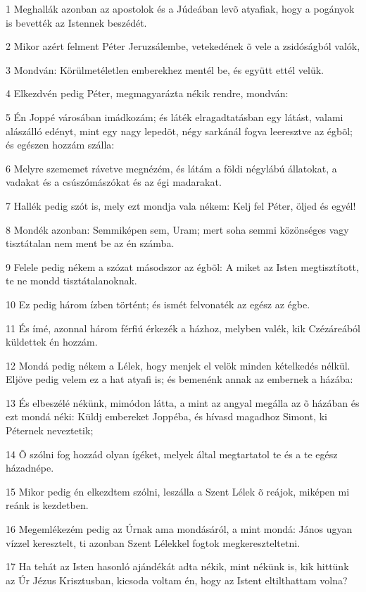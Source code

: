 \par 1 Meghallák azonban az apostolok és a Júdeában levõ atyafiak, hogy a pogányok is bevették az Istennek beszédét.
\par 2 Mikor azért felment Péter Jeruzsálembe, vetekedének õ vele a zsidóságból valók,
\par 3 Mondván: Körülmetéletlen emberekhez mentél be, és együtt ettél velük.
\par 4 Elkezdvén pedig Péter, megmagyarázta nékik rendre, mondván:
\par 5 Én Joppé városában imádkozám; és láték elragadtatásban egy látást, valami alászálló edényt, mint egy nagy lepedõt, négy sarkánál fogva leeresztve az égbõl; és egészen hozzám szálla:
\par 6 Melyre szememet rávetve megnézém, és látám a földi négylábú állatokat, a vadakat és a csúszómászókat és az égi madarakat.
\par 7 Hallék pedig szót is, mely ezt mondja vala nékem: Kelj fel Péter, öljed és egyél!
\par 8 Mondék azonban: Semmiképen sem, Uram; mert soha semmi közönséges vagy tisztátalan nem ment be az én számba.
\par 9 Felele pedig nékem a szózat másodszor az égbõl: A miket az Isten megtisztított, te ne mondd tisztátalanoknak.
\par 10 Ez pedig három ízben történt; és ismét felvonaték az egész az égbe.
\par 11 És ímé, azonnal három férfiú érkezék a házhoz, melyben valék, kik Czézáreából küldettek én hozzám.
\par 12 Mondá pedig nékem a Lélek, hogy menjek el velök minden kételkedés nélkül. Eljöve pedig velem ez a hat atyafi is; és bemenénk annak az embernek a házába:
\par 13 És elbeszélé nékünk, mimódon látta, a mint az angyal megálla az õ házában és ezt mondá néki: Küldj embereket Joppéba, és hívasd magadhoz Simont, ki Péternek neveztetik;
\par 14 Õ szólni fog hozzád olyan ígéket, melyek által megtartatol te és a te egész házadnépe.
\par 15 Mikor pedig én elkezdtem szólni, leszálla a Szent Lélek õ reájok, miképen mi reánk is kezdetben.
\par 16 Megemlékezém pedig az Úrnak ama mondásáról, a mint mondá: János ugyan vízzel keresztelt, ti azonban Szent Lélekkel fogtok megkereszteltetni.
\par 17 Ha tehát az Isten hasonló ajándékát adta nékik, mint nékünk is, kik hittünk az Úr Jézus Krisztusban, kicsoda voltam én, hogy az Istent eltilthattam volna?
